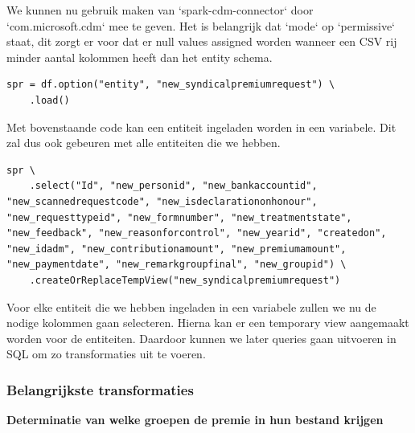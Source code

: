 We kunnen nu gebruik maken van `spark-cdm-connector` door `com.microsoft.cdm` mee te geven. Het is belangrijk dat `mode` op `permissive` staat, dit zorgt er voor dat er null values assigned worden wanneer een CSV rij minder aantal kolommen heeft dan het entity schema.


\begin{verbatim}
spr = df.option("entity", "new_syndicalpremiumrequest") \
    .load()
\end{verbatim}

Met bovenstaande code kan een entiteit ingeladen worden in een variabele. Dit zal dus ook gebeuren met alle entiteiten die we hebben.


\begin{verbatim}
spr \
    .select("Id", "new_personid", "new_bankaccountid", "new_scannedrequestcode", "new_isdeclarationonhonour", "new_requesttypeid", "new_formnumber", "new_treatmentstate", "new_feedback", "new_reasonforcontrol", "new_yearid", "createdon", "new_idadm", "new_contributionamount", "new_premiumamount", "new_paymentdate", "new_remarkgroupfinal", "new_groupid") \
    .createOrReplaceTempView("new_syndicalpremiumrequest")
\end{verbatim}

Voor elke entiteit die we hebben ingeladen in een variabele zullen we nu de nodige kolommen gaan selecteren. Hierna kan er een temporary view aangemaakt worden voor de entiteiten. Daardoor kunnen we later queries gaan uitvoeren in SQL om zo transformaties uit te voeren.

\subsubsection{Belangrijkste transformaties}

\textbf{Determinatie van welke groepen de premie in hun bestand krijgen}


